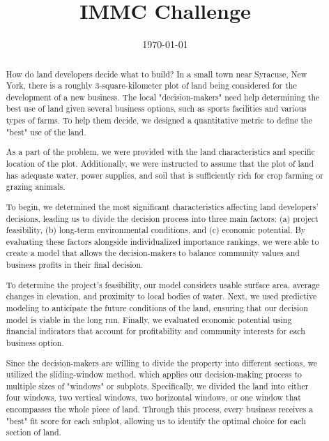 \documentclass{mcmthesis}
\title{IMMC Challenge}
\date{\today}
\begin{document}
\begin{abstract}
How do land developers decide what to build? In a small town near Syracuse, New York, there is a roughly 3-square-kilometer plot of land being considered for the development of a new business. The local "decision-makers" need help determining the best use of land given several business options, such as sports facilities and various types of farms. To help them decide, we designed a quantitative metric to define the "best" use of the land.

As a part of the problem, we were provided with the land characteristics and specific location of the plot. Additionally, we were instructed to assume that the plot of land has adequate water, power supplies, and soil that is sufficiently rich for crop farming or grazing animals. 

To begin, we determined the most significant characteristics affecting land developers' decisions, leading us to divide the decision process into three main factors: (a) project feasibility, (b) long-term environmental conditions, and (c) economic potential. By evaluating these factors alongside individualized importance rankings, we were able to create a model that allows the decision-makers to balance community values and business profits in their final decision. 

To determine the project's feasibility, our model considers usable surface area, average changes in elevation, and proximity to local bodies of water. Next, we used predictive modeling to anticipate the future conditions of the land, ensuring that our decision model is viable in the long run. Finally, we evaluated economic potential using financial indicators that account for profitability and community interests for each business option. 

Since the decision-makers are willing to divide the property into different sections, we utilized the sliding-window method, which applies our decision-making process to multiple sizes of "windows" or subplots. Specifically, we divided the land into either four windows, two vertical windows, two horizontal windows, or one window that encompasses the whole piece of land. Through this process, every business receives a "best" fit score for each subplot, allowing us to identify the optimal choice for each section of land. 



\end{abstract}
\end{document}
